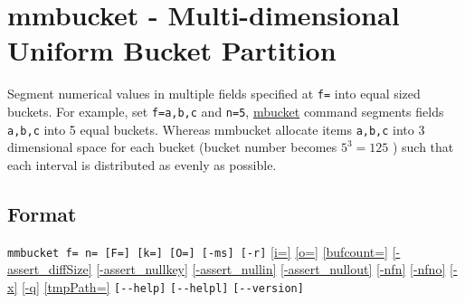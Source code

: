 
%

\section{mmbucket - Multi-dimensional Uniform Bucket Partition\label{sect:mmbucket}}

Segment numerical values in multiple fields specified at \verb|f=| into equal sized buckets. For example, set \verb|f=a,b,c| and \verb|n=5|, \hyperref[sect:mbucket]{mbucket} command segments fields \verb|a,b,c| into 5 equal buckets. Whereas mmbucket allocate items \verb|a,b,c| into 3 dimensional space for each bucket (bucket number becomes $5^3=125$ ) such that each interval is distributed as evenly as possible. 


\subsection*{Format}
\verb|mmbucket f= n= [F=] [k=] [O=] [-ms] [-r]| 
\hyperref[sect:option_i]{[i=]}
\hyperref[sect:option_o]{[o=]}
\hyperref[sect:option_bufcount]{[bufcount=]} 
\hyperref[sect:option_assert_diffSize]{[-assert\_diffSize]}
\hyperref[sect:option_assert_nullkey]{[-assert\_nullkey]}
\hyperref[sect:option_assert_nullin]{[-assert\_nullin]}
\hyperref[sect:option_assert_nullout]{[-assert\_nullout]}
\hyperref[sect:option_nfn]{[-nfn]} 
\hyperref[sect:option_nfno]{[-nfno]}  
\hyperref[sect:option_x]{[-x]}
\hyperref[sect:option_q]{[-q]}
\hyperref[sect:option_option_tmppath]{[tmpPath=]}
\verb|[--help]|
\verb|[--helpl]|
\verb|[--version]|\\

